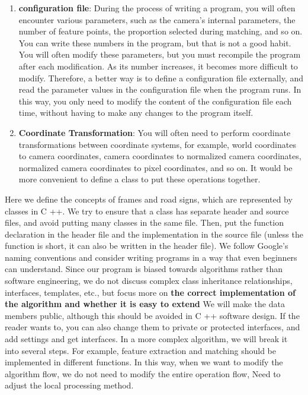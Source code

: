 \begin{enumerate}
\item \textbf{configuration file}: During the process of writing a program, you will often encounter various parameters, such as the camera's internal parameters, the number of feature points, the proportion selected during matching, and so on. You can write these numbers in the program, but that is not a good habit. You will often modify these parameters, but you must recompile the program after each modification. As its number increases, it becomes more difficult to modify. Therefore, a better way is to define a configuration file externally, and read the parameter values ​​in the configuration file when the program runs. In this way, you only need to modify the content of the configuration file each time, without having to make any changes to the program itself.
\item \textbf{Coordinate Transformation}: You will often need to perform coordinate transformations between coordinate systems, for example, world coordinates to camera coordinates, camera coordinates to normalized camera coordinates, normalized camera coordinates to pixel coordinates, and so on. It would be more convenient to define a class to put these operations together.
\end{enumerate}

Here we define the concepts of frames and road signs, which are represented by classes in C ++. We try to ensure that a class has separate header and source files, and avoid putting many classes in the same file. Then, put the function declaration in the header file and the implementation in the source file (unless the function is short, it can also be written in the header file). We follow Google's naming conventions and consider writing programs in a way that even beginners can understand. Since our program is biased towards algorithms rather than software engineering, we do not discuss complex class inheritance relationships, interfaces, templates, etc., but focus more on \textbf{the correct implementation of the algorithm and whether it is easy to extend} We will make the data members public, although this should be avoided in C ++ software design. If the reader wants to, you can also change them to private or protected interfaces, and add settings and get interfaces. In a more complex algorithm, we will break it into several steps. For example, feature extraction and matching should be implemented in different functions. In this way, when we want to modify the algorithm flow, we do not need to modify the entire operation flow, Need to adjust the local processing method.

